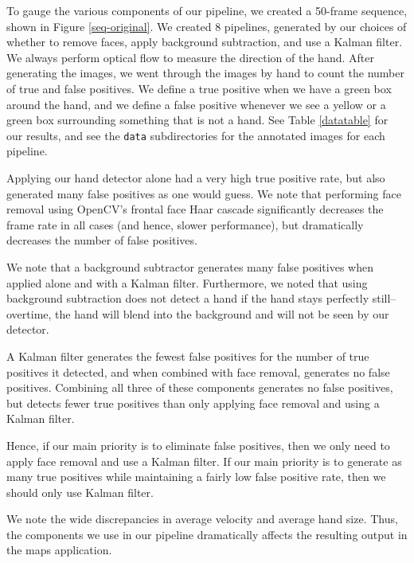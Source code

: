 \documentclass[12pt]{article}
\begin{document}
To gauge the various components of our pipeline, we created a 50-frame sequence, shown in Figure \ref{seq-original}. We created 8 pipelines, generated by our choices of whether to remove faces, apply background subtraction, and use a Kalman filter. We always perform optical flow to measure the direction of the hand. After generating the images, we went through the images by hand to count the number of true and false positives. We define a true positive when we have a green box around the hand, and we define a false positive whenever we see a yellow or a green box surrounding something that is not a hand. See Table \ref{datatable} for our results, and see the \texttt{data} subdirectories for the annotated images for each pipeline.

Applying our hand detector alone had a very high true positive rate, but also generated many false positives as one would guess. We note that performing face removal using OpenCV's frontal face Haar cascade significantly decreases the frame rate in all cases (and hence, slower performance), but dramatically decreases the number of false positives. 

We note that a background subtractor generates many false positives when applied alone and with a Kalman filter. Furthermore, we noted that using background subtraction does not detect a hand if the hand stays perfectly still--overtime, the hand will blend into the background and will not be seen by our detector. 

A Kalman filter generates the fewest false positives for the number of true positives it detected, and when combined with face removal, generates no false positives. Combining all three of these components generates no false positives, but detects fewer true positives than only applying face removal and using a Kalman filter. 

Hence, if our main priority is to eliminate false positives, then we only need to apply face removal and use a Kalman filter. If our main priority is to generate as many true positives while maintaining a fairly low false positive rate, then we should only use Kalman filter.

We note the wide discrepancies in average velocity and average hand size. Thus, the components we use in our pipeline dramatically affects the resulting output in the maps application.
\end{document}
